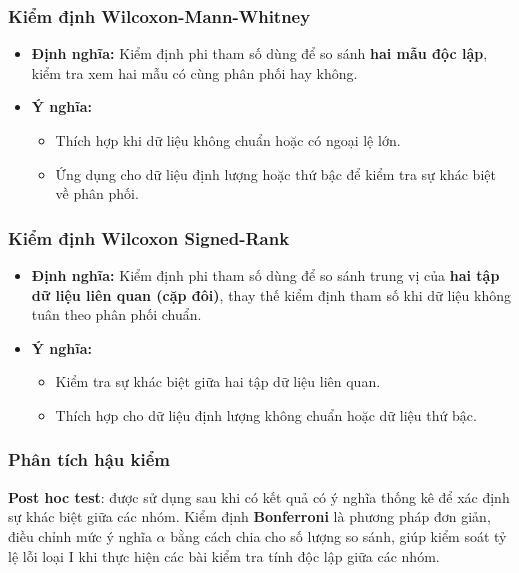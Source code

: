 \subsubsection{Kiểm định Wilcoxon-Mann-Whitney}  
\begin{itemize}
    \item \textbf{Định nghĩa:} Kiểm định phi tham số dùng để so sánh \textbf{hai mẫu độc lập}, kiểm tra xem hai mẫu có cùng phân phối hay không.  
    \item \textbf{Ý nghĩa:}  
    \begin{itemize}
        \item Thích hợp khi dữ liệu không chuẩn hoặc có ngoại lệ lớn.  
        \item Ứng dụng cho dữ liệu định lượng hoặc thứ bậc để kiểm tra sự khác biệt về phân phối.  
    \end{itemize}
\end{itemize}

\subsubsection{Kiểm định Wilcoxon Signed-Rank}  
\begin{itemize}
    \item \textbf{Định nghĩa:} Kiểm định phi tham số dùng để so sánh trung vị của \textbf{hai tập dữ liệu liên quan (cặp đôi)}, thay thế kiểm định tham số khi dữ liệu không tuân theo phân phối chuẩn.  
    \item \textbf{Ý nghĩa:}  
    \begin{itemize}
        \item Kiểm tra sự khác biệt giữa hai tập dữ liệu liên quan.  
        \item Thích hợp cho dữ liệu định lượng không chuẩn hoặc dữ liệu thứ bậc.  
    \end{itemize}
\end{itemize}

\subsubsection{Phân tích hậu kiểm}
\textbf{Post hoc test}: được sử dụng sau khi có kết quả có ý nghĩa thống kê để xác định sự khác biệt giữa các nhóm. Kiểm định \textbf{Bonferroni} là phương pháp đơn giản, điều chỉnh mức ý nghĩa \(\alpha\) bằng cách chia cho số lượng so sánh, giúp kiểm soát tỷ lệ lỗi loại I khi thực hiện các bài kiểm tra tính độc lập giữa các nhóm.

